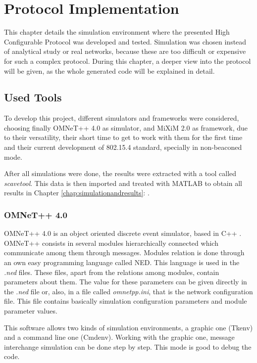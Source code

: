\chapter{Protocol Implementation}
\label{chap:protocolimplementation}

This chapter details the simulation environment where the presented High Configurable Protocol was developed and tested. Simulation was chosen 
instead of analytical study or real networks, because these are too difficult or expensive for such a complex protocol. During this chapter, a 
deeper view into the protocol will be given, as the whole generated code will be explained in detail.

\section{Used Tools}

To develop this project, different simulators and frameworks were considered, choosing finally \ac{OMNeT++} 4.0 \cite{OMNeT}
as simulator, and \ac{MiXiM} 2.0 \cite{MiXiM} as framework, due to their versatility, their short time to get to work with them for the first time and 
their current development of 802.15.4 standard, specially in non-beaconed mode.

After all simulations were done, the results were extracted with a tool called \textit{scavetool}. This data is then imported and treated with 
\ac{MATLAB} \cite{MATLAB} to obtain all results in Chapter \ref{chap:simulationandresults}: .

\subsection{\ac{OMNeT++} 4.0}

\ac{OMNeT++} 4.0 is an object oriented discrete event simulator, based in C++ \cite{cpp}. \ac{OMNeT++} consists in several modules hierarchically
connected which communicate among them through messages. Modules relation is done through an own easy programming language called \ac{NED}.
This language is used in the \textit{.ned} files. These files, apart from the relations among modules, contain parameters about them. The value for these
parameters can be given directly in the \textit{.ned} file or, also, in a file called \textit{omnetpp.ini}, that is the network configuration file.
This file contains basically simulation configuration parameters and module parameter values.

This software allows two kinds of simulation environments, a graphic one (Tkenv) and a command line one (Cmdenv). Working with the graphic one, 
message interchange simulation can be done step by step. This mode is good to debug the code.

